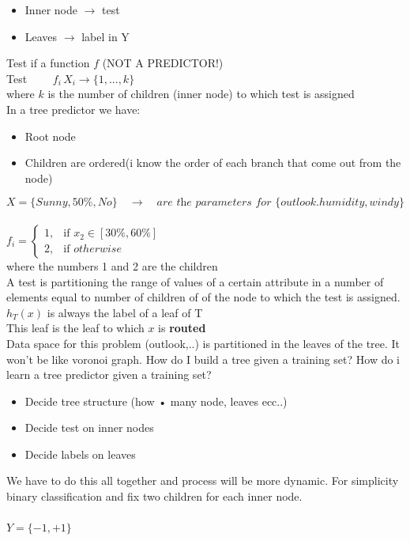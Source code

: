 \documentclass[../main.tex]{subfiles}
\begin{document}
\begin{itemize}
\item Inner node $\rightarrow$ test
\item Leaves $\rightarrow$ label in Y
\end{itemize}
Test if a function $f$ (NOT A PREDICTOR!) \\
Test $ \qquad f_i \, X_i \rightarrow \{1,...,k\}$
\\ where $k$ is the number of children (inner node) to which test is assigned
\\
In a tree predictor we have:
\begin{itemize}
\item Root node
\item Children are ordered(i know the order of each branch that come out from the node)
\end{itemize}
$$
X = \{Sunny, 50\%, No \} \quad \rightarrow \quad \textit{are the parameters for } \{outlook. humidity, windy \} 
$$
\\
$
f_i = 
\begin{cases} 
1, & \mbox{if } x_2 \in [30 \%,60 \% ] 
\\ 
2, & \mbox{if } otherwise \end{cases}
$
\\ where the numbers 1 and 2 are the children
\\
A test is partitioning the range of values of a certain attribute in a number of
elements equal to number of children of of the node to which the test is
assigned.
\\
$h_T(x)$ is always the label of a leaf of T\\
This leaf is the leaf to which $x$ is \textbf{routed}
\\
Data space for this problem (outlook,..) is partitioned in the leaves of the tree.
It won’t be like voronoi graph.
How do I build a tree given a training set?
How do i learn a tree predictor given a training set?
\begin{itemize}
\item Decide tree structure (how • many node, leaves ecc..)
\item Decide test on inner nodes
\item Decide labels on leaves
\end{itemize}
We have to do this all together and process will be more dynamic.
For simplicity binary classification and fix two children for each inner node.\\\\
$ Y = \{-1, +1 \}$
\end{document}

